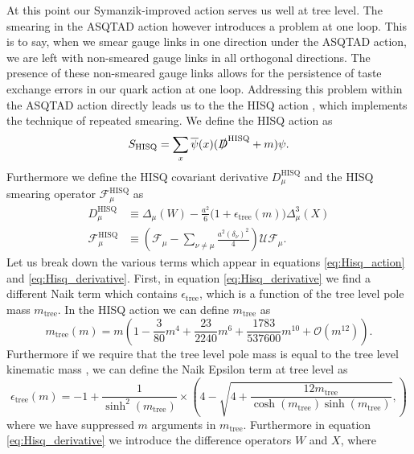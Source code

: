 At this point our Symanzik-improved action serves us well at tree level.  The smearing in the ASQTAD action however introduces a problem at one loop.  This is to say, when we smear gauge links in one direction under the ASQTAD action, we are left with non-smeared gauge links in all orthogonal directions.  The presence of these non-smeared gauge links allows for the persistence of taste exchange errors in our quark action at one loop.  Addressing this problem within the ASQTAD action directly leads us to the the HISQ action \cite{HISQ:2006rc}, which implements the technique of repeated smearing.  We define the HISQ action as
\begin{equation}\label{eq:Hisq_action}
    S_\mathrm{HISQ} = \sum_x \overline\psi (x) (\slashed{D}^\mathrm{HISQ}+m)\psi.
\end{equation}
Furthermore we define the HISQ covariant derivative $D_\mu^\mathrm{HISQ}$ and the HISQ smearing operator $\mathcal{F}_\mu^\mathrm{HISQ}$ as
\begin{align}\label{eq:Hisq_derivative}
    D_\mu^\mathrm{HISQ}  &\equiv \Delta_\mu(W) - \frac{a^2}{6}\big(1+\epsilon_\mathrm{tree}(m)\big)\Delta^3_\mu(X)\\ \label{eq:HISQ_smear}
    \mathcal{F}_\mu^\mathrm{HISQ} &\equiv \left( 
    \mathcal{F_\mu} - 
    \sum_{\nu\neq\mu}\frac{a^2(\delta_\nu)^2}{4}
    \right)\mathcal{U}\mathcal{F}_\mu.
\end{align}
Let us break down the various terms which appear in equations \ref{eq:Hisq_action} and \ref{eq:Hisq_derivative}.  First, in equation \ref{eq:Hisq_derivative} we find a different Naik term which contains $\epsilon_\mathrm{tree}$, which is a function of the tree level pole mass $m_\mathrm{tree}$. In the HISQ action we can define $m_\mathrm{tree}$ as 
\begin{equation}\label{eq:m_tree}
    m_\mathrm{tree}(m) = m\left( 1 - \frac{3}{80}m^4 + \frac{23}{2240}m^6 + \frac{1783}{537600}m^{10} + \mathcal{O}(m^{12}) \right).
\end{equation}
Furthermore if we require that the tree level pole mass is equal to the tree level kinematic mass \cite{zdisc}, we can define the Naik Epsilon term \cite{NAIK1989238} at tree level as
\begin{equation}\label{eq:naik_epsilon}
    \epsilon_\mathrm{tree}(m) = -1 + \frac{1}{\sinh^2(m_\mathrm{tree})} \times 
    \left( 4 - \sqrt{4+\frac{12m_\mathrm{tree}}{\cosh({m_\mathrm{tree}})\sinh(m_\mathrm{tree})}},
    \right)
\end{equation}
where we have suppressed $m$ arguments in $m_\mathrm{tree}$.  Furthermore in equation \ref{eq:Hisq_derivative} we introduce the difference operators $W$ and $X$, where 
